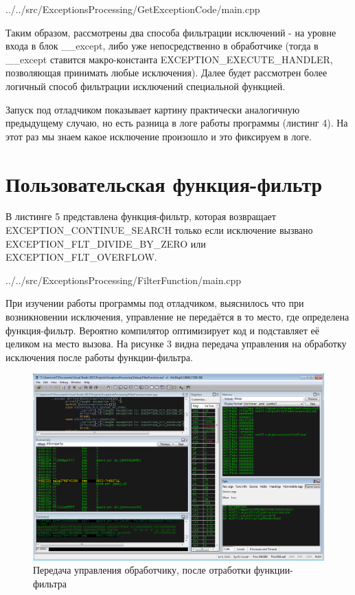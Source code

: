 \documentclass[a4paper, 12pt]{report}		%
\begin{document}

{../../src/ExceptionsProcessing/GetExceptionCode/main.cpp}

Таким образом, рассмотрены два способа фильтрации исключений - на уровне входа в блок \_\_except, либо уже непосредственно в обработчике (тогда в \_\_except ставится макро-константа EXCEPTION\_EXECUTE\_HANDLER, позволяющая принимать любые исключения). Далее будет рассмотрен более логичный способ фильтрации исключений специальной функцией.

Запуск под отладчиком показывает картину практически аналогичную предыдущему случаю, но есть разница в логе работы программы (листинг 4). На этот раз мы знаем какое исключение произошло и это фиксируем в логе.




\chapter*{Пользовательская функция-фильтр}

В листинге 5 представлена функция-фильтр, которая возвращает \\ EXCEPTION\_CONTINUE\_SEARCH только если исключение вызвано \\ EXCEPTION\_FLT\_DIVIDE\_BY\_ZERO или EXCEPTION\_FLT\_OVERFLOW.


{../../src/ExceptionsProcessing/FilterFunction/main.cpp}

При изучении работы программы под отладчиком, выяснилось что при возникновении исключения, управление не передаётся в то место, где определена функция-фильтр. Вероятно компилятор оптимизирует код и подставляет её целиком на место вызова. На рисунке 3 видна передача управления на обработку исключения после работы функции-фильтра.

\begin{figure}[h!]
\centering
\includegraphics[scale=0.5]{res/003}
\caption{Передача управления обработчику, после отработки функции-фильтра}
\end{figure}
\end{document}
